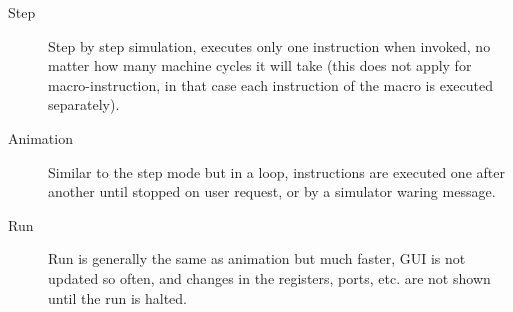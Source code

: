         \begin{description}
            \item [Step]
                Step by step simulation, executes only one instruction when invoked, no matter how many machine cycles
                it will take (this does not apply for macro-instruction, in that case each instruction of the macro is
                executed separately).
            \item [Animation]
                Similar to the step mode but in a loop, instructions are executed one after another until stopped on
                user request, or by a simulator waring message.
            \item [Run]
                Run is generally the same as animation but much faster, GUI is not updated so often, and changes in the
                registers, ports, etc. are not shown until the run is halted.
        \end{description}
